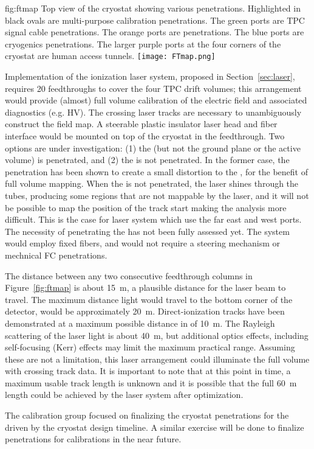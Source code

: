 
\begin{dunefigure}{fig:ftmap}{
Top view of the  cryostat showing various penetrations. 
Highlighted in black ovals are multi-purpose calibration penetrations. 
The green ports are TPC signal cable penetrations. 
The orange ports are  penetrations. The blue ports are cryogenics penetrations.
The larger purple ports at the four corners of the cryostat are human access tunnels.}
\texttt{[image: FTmap.png]}
\end{dunefigure}


Implementation of the ionization laser system, proposed in Section~\ref{sec:laser}, requires 20 feedthroughs to cover the four TPC drift volumes; this arrangement would provide (almost) full volume calibration of the electric field and associated diagnostics (e.g. HV). The crossing laser tracks are necessary to unambiguously construct the field map. A steerable plastic insulator laser head and fiber interface would be mounted on top of the cryostat in the feedthrough. Two options are under investigation: (1) the  (but not the ground plane or the active volume) is penetrated, and (2) the  is not penetrated. In the former case, the  penetration has been shown to create a small distortion to the \efield, for the benefit of full volume \efield mapping. When the  is not penetrated, the laser shines through the  tubes, producing some regions that are not mappable by the laser, and it will not be possible to map the position of the track start making the analysis more difficult. This is the case for laser system which use the far east and west ports. The necessity of penetrating the  has not been fully assessed yet. The \phel system would employ fixed fibers, and would not require a steering mechanism or mechnical FC penetrations.

The distance between any two consecutive feedthrough columns in Figure~\ref{fig:ftmap} is about \SI{15}{\m}, a plausible distance for the laser beam to travel. The maximum distance light would travel to the bottom corner of the detector, would be approximately \SI{20}{\m}.  Direct-ionization tracks have been demonstrated at a maximum possible distance in \microboone of \SI{10}{\m}. The Rayleigh scattering of the laser light is about \SI{40}{\m}, but additional optics effects, including self-focusing (Kerr) effects may limit the maximum practical range. Assuming these are not a limitation, this laser arrangement could illuminate the full volume with crossing track data. It is important to note that at this point in time, a maximum usable track length is unknown and it is possible that the full \SI{60}{\m} \detmodule length could be achieved by the laser system after optimization.

The calibration group focused on finalizing the cryostat penetrations for the \spmod driven by the cryostat design timeline. A similar exercise will be done to finalize \dpmod penetrations for calibrations in the near future.

